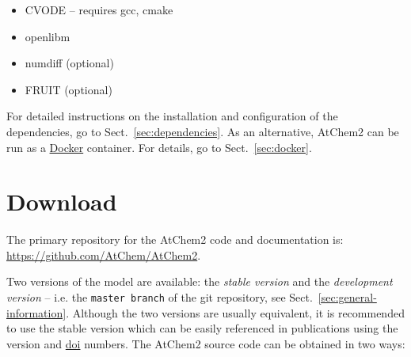 \begin{itemize}
\item CVODE -- requires gcc, cmake %
\item openlibm
\item numdiff (optional)
\item FRUIT (optional)
\end{itemize}

For detailed instructions on the installation and configuration of the
dependencies, go to Sect.~\ref{sec:dependencies}. As an alternative,
AtChem2 can be run as a \href{https://www.docker.com}{Docker}
container. For details, go to Sect.~\ref{sec:docker}.

\section{Download} \label{sec:download}

The primary repository for the AtChem2 code and documentation is:\\
\href{https://github.com/AtChem/AtChem2}{https://github.com/AtChem/AtChem2}.

Two versions of the model are available: the \emph{stable version} and the
\emph{development version} -- i.e. the \texttt{master\ branch} of the git
repository, see Sect.~\ref{sec:general-information}. Although the two
versions are usually equivalent, it is recommended to use the stable
version which can be easily referenced in publications using the version
and \href{https://www.doi.org/the-identifier/what-is-a-doi}{doi} numbers.
The AtChem2 source code can be obtained in two ways:

